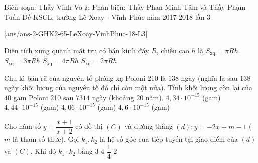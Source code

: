 \begin{name}
{Biên soạn: Thầy Vinh Vo \& Phản biện: Thầy Phan Minh Tâm và Thầy Phạm Tuấn}
{Đề KSCL, trường Lê Xoay - Vĩnh Phúc năm 2017-2018 lần 3}
\end{name}
\setcounter{ex}{0}\setcounter{bt}{0}
[ans/ans-2-GHK2-65-LeXoay-VinhPhuc-18-L3]
\begin{ex}%
Diện tích xung quanh mặt trụ có bán kính đáy $ R $, chiều cao $ h $ là
\choice
{$ S_{\text{xq}} = \pi Rh $}
{$ S_{\text{xq}} = 3\pi Rh $}
{$ S_{\text{xq}} = 4\pi Rh $}
{\True $ S_{\text{xq}} = 2\pi Rh $}
\end{ex}
\begin{ex}%
Chu kì bán rã của nguyên tố phóng xạ Poloni $ 210 $	là $ 138 $ ngày (nghĩa là sau $ 138 $ ngày khối lượng của nguyên tố đó chỉ còn một nửa). Tính khối lượng còn lại của $ 40 $ gam Poloni 210 sau $ 7314 $ ngày (khoảng $ 20 $ năm).
	\choice
	{$ 4{ , }34 \cdot 10^{-15} $ (gam)}
	{\True $ 4{ , }44 \cdot 10^{-15} $ (gam)}
	{$ 4{ , }06 \cdot 10^{-15} $ (gam)}
	{$ 4{ , }6 \cdot 10^{-15} $ (gam)}
\end{ex}
\begin{ex}%
	Cho hàm số $ y = \dfrac{x + 1}{x + 2} $ có đồ thị $ (C) $ và đường thẳng $ (d) \colon y = -2x + m - 1 $ ($ m $ là tham số thực). Gọi $ k_1, k_2 $ là hệ số góc của tiếp tuyến tại giao điểm của $ (d) $ và $ (C) $. Khi đó $ k_1 \cdot k_2 $ bằng
	\choice
	{$ 3 $}
	{\True $ 4 $}
	{$ \dfrac{1}{4} $}
	{$ 2 $}
\end{ex}
